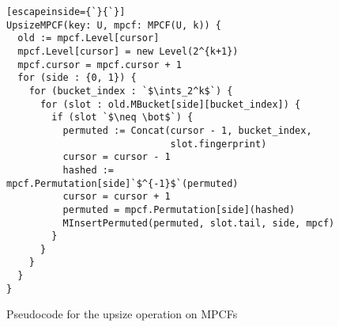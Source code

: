 \documentclass[letterpaper, 11pt]{article}
\newcommand{\ints}{\mathbb{Z}}
\begin{document}
\begin{figure}
\begin{lstlisting}[escapeinside={`}{`}]
UpsizeMPCF(key: U, mpcf: MPCF(U, k)) {
  old := mpcf.Level[cursor]
  mpcf.Level[cursor] = new Level(2^{k+1})
  mpcf.cursor = mpcf.cursor + 1
  for (side : {0, 1}) {
    for (bucket_index : `$\ints_2^k$`) {
      for (slot : old.MBucket[side][bucket_index]) {
        if (slot `$\neq \bot$`) {
          permuted := Concat(cursor - 1, bucket_index,
                             slot.fingerprint)
          cursor = cursor - 1
          hashed := mpcf.Permutation[side]`$^{-1}$`(permuted)
          cursor = cursor + 1
          permuted = mpcf.Permutation[side](hashed)
          MInsertPermuted(permuted, slot.tail, side, mpcf)
        }
      }
    }
  }
}
\end{lstlisting}
\caption{Pseudocode for the upsize operation on MPCFs}
\end{figure}
\end{document}
